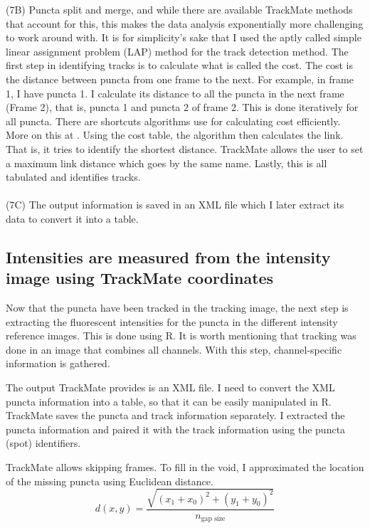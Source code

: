 \begin{centering}
{(7B) Puncta split and merge, and while there are available TrackMate methods that account for this, this makes the data analysis exponentially more challenging to work around with. It is for simplicity's sake that I used the aptly called simple linear assignment problem (LAP) method for the track detection method. The first step in identifying tracks is to calculate what is called the cost. The cost is the distance between puncta from one frame to the next. For example, in frame 1, I have puncta 1. I calculate its distance to all the puncta in the next frame (Frame 2), that is, puncta 1 and puncta 2 of frame 2. This is done iteratively for all puncta. There are shortcuts algorithms use for calculating cost efficiently. More on this at \autocite{Tinevez_2017}. Using the cost table, the algorithm then calculates the link. That is, it tries to identify the shortest distance. TrackMate allows the user to set a maximum link distance which goes by the same name. Lastly, this is all tabulated and identifies tracks.
\\
\\
(7C) The output information is saved in an XML file which I later extract its data to convert it into a table.}
\label{m:4}
\end{centering}

\subsection{Intensities are measured from the intensity image using TrackMate coordinates}
Now that the puncta have been tracked in the tracking image, the next step is extracting the fluorescent intensities for the puncta in the different intensity reference images. This is done using R. It is worth mentioning that tracking was done in an image that combines all channels. With this step, channel-specific information is gathered.

The output TrackMate provides is an XML file. I need to convert the XML puncta information into a table, so that it can be easily manipulated in R. TrackMate saves the puncta and track information separately. I extracted the puncta information and paired it with the track information using the puncta (spot) identifiers.

TrackMate allows skipping frames. To fill in the void, I approximated the location of the missing puncta using Euclidean distance. \begin{equation*}d(x, y) = \frac{\sqrt{(x_{1} + x_{0})^2 + (y_{1} + y_{0})^2}}{n_\text{gap size}}\end{equation*}

